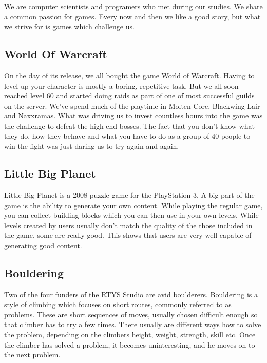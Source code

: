 \documentclass[10pt]{scrartcl}
\begin{document}
We are computer scientists and programers who met during our studies.
We share a common passion for games. Every now and then we like a good story,
    but what we strive for is games which challenge us.



\subsection{World Of Warcraft\texttrademark}

On the day of its release, we all bought the game World of Warcraft.
Having to level up your character is mostly a boring, repetitive task.
But we all soon reached level 60 and started doing raids as part of one of
    most successful guilds on the server.
We've spend much of the playtime in Molten Core, Blackwing Lair and Naxxramas.
What was driving us to invest countless hours into the game was the challenge
    to defeat the high-end bosses.
The fact that you don't know what they do, how they behave and what you have
    to do as a group of 40 people to win the fight was just daring us to try
    again and again.


\subsection{Little Big Planet\texttrademark}

Little Big Planet is a 2008 puzzle game for the PlayStation 3. A big part of
    the game is the ability to generate your own content.
While playing the regular game, you can collect building blocks which you can
    then use in your own levels.
While levels created by users usually don't match the quality of the those
    included in the game, some are really good.
This shows that users are very well capable of generating good content.


\subsection{Bouldering}

Two of the four funders of the RTYS Studio are avid boulderers.
Bouldering is a style of climbing which focuses on short routes, commonly
    referred to as problems.
These are short sequences of moves, usually chosen difficult enough so that
    climber has to try a few times.
There usually are different ways how to solve the problem, depending on the
    climbers height, weight, strength, skill etc.
Once the climber has solved a problem, it becomes uninteresting, and he moves
    on to the next problem.
\end{document}
